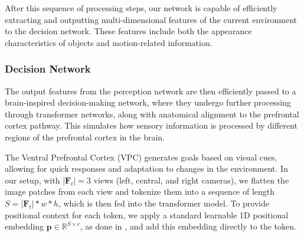 %
After this sequence of processing steps, our network is capable of efficiently extracting and outputting multi-dimensional features of the current environment to the decision network. 
These features include both the appearance characteristics of objects and motion-related information.




\subsubsection{Decision Network}
The output features from the perception network are then efficiently passed to a brain-inspired decision-making network, where they undergo further processing through transformer networks, along with anatomical alignment to the prefrontal cortex pathway. 
This simulates how sensory information is processed by different regions of the prefrontal cortex in the brain.
%


The Ventral Prefrontal Cortex (VPC) generates goals based on visual cues, allowing for quick responses and adaptation to changes in the environment.
%
In our setup, with $|\mathbf{F}_{t}|=3$ views (left, central, and right cameras), we flatten the image patches from each view and tokenize them into a sequence of length $S=|\mathbf{F}_t|*w*h$, which is then fed into the transformer model.
To provide positional context for each token, we apply a standard learnable 1D positional embedding $\mathbf{p}\in \mathbb{R}^{S\times c}$, as done in \cite{Alexey:2021}, and add this embedding directly to the token.


